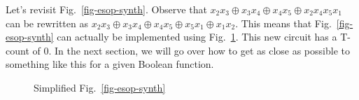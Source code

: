 \begin{example}
  \label{ex-esop-synth2}
  Let's revisit Fig.~\ref{fig-esop-synth}. Observe that
  $x_2x_3 \oplus x_3x_4 \oplus x_4x_5 \oplus x_2x_4 x_5x_1$ can be rewritten as
  $x_2x_3 \oplus x_3x_4 \oplus x_4x_5 \oplus x_5x_1 \oplus x_1x_2$. This means that
  Fig.~\ref{fig-esop-synth} can actually be implemented using Fig.~\ref{fig-esop-synth2}.
  This new circuit has a T-count of 0. In the next section, we will go over how to
  get as close as possible to something like this for a given Boolean function.

  \begin{figure}[t]
    \centering
    \scalebox{1.0}{
      
    }
    \caption{Simplified Fig.~\ref{fig-esop-synth}}
    \label{fig-esop-synth2}
  \end{figure}
\end{example}

